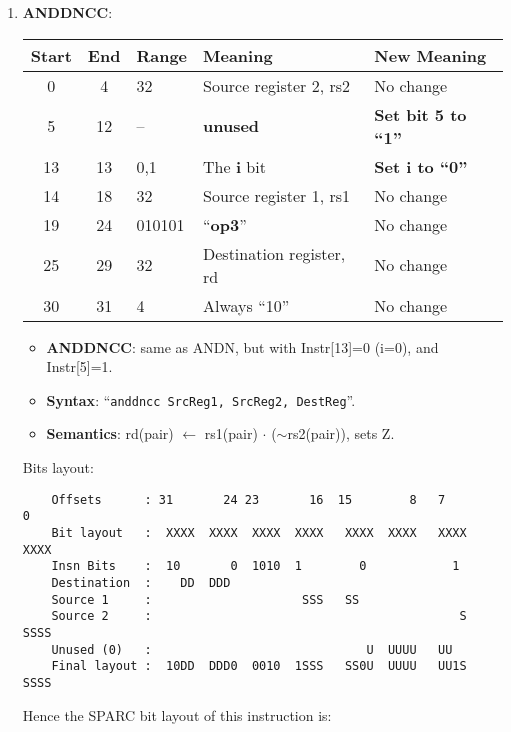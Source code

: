 \begin{enumerate}
\item \textbf{ANDDNCC}:\\
  \begin{center}
    \begin{tabular}[p]{|c|c|l|l|l|}
      \hline
      \textbf{Start} & \textbf{End} & \textbf{Range} & \textbf{Meaning} &
                                                                          \textbf{New Meaning}\\
      \hline
      0 & 4 & 32 & Source register 2, rs2 & No change \\
      5 & 12 & -- & \textbf{unused} & \textbf{Set bit 5 to ``1''} \\
      13 & 13 & 0,1 & The \textbf{i} bit & \textbf{Set i to ``0''} \\
      14 & 18 & 32 & Source register 1, rs1 & No change \\
      19 & 24 & 010101 & ``\textbf{op3}'' & No change \\
      25 & 29 & 32 & Destination register, rd & No change \\
      30 & 31 & 4 & Always ``10'' & No change \\
      \hline
    \end{tabular}
  \end{center}
  \begin{itemize}
  \item []\textbf{ANDDNCC}: same as ANDN, but with Instr[13]=0 (i=0), and
    Instr[5]=1.
  \item []\textbf{Syntax}: ``\texttt{anddncc  SrcReg1, SrcReg2, DestReg}''.
  \item []\textbf{Semantics}: rd(pair) $\leftarrow$ rs1(pair) $\cdot$
    ($\sim$rs2(pair)), sets Z.
  \end{itemize}
  Bits layout:
\begin{verbatim}
    Offsets      : 31       24 23       16  15        8   7        0
    Bit layout   :  XXXX  XXXX  XXXX  XXXX   XXXX  XXXX   XXXX  XXXX
    Insn Bits    :  10       0  1010  1        0            1       
    Destination  :    DD  DDD                                       
    Source 1     :                     SSS   SS
    Source 2     :                                           S  SSSS
    Unused (0)   :                              U  UUUU   UU        
    Final layout :  10DD  DDD0  0010  1SSS   SS0U  UUUU   UU1S  SSSS
\end{verbatim}

  Hence the SPARC bit layout of this instruction is:


\end{enumerate}
